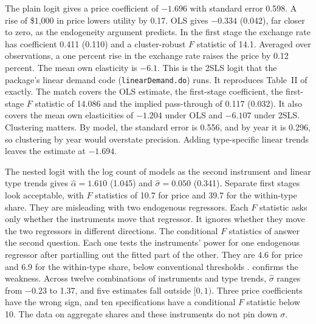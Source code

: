 The plain logit gives a price coefficient of $-1.696$ with standard error 0.598. A rise of \$1,000 in price lowers
utility by 0.17. OLS gives $-0.334$ (0.042), far closer to zero, as the endogeneity argument predicts. In the first stage
the exchange rate has coefficient 0.411 (0.110) and a cluster-robust $F$ statistic of 14.1. Averaged over observations, a
one percent rise in the exchange rate raises the price by 0.12 percent. The mean own elasticity is $-6.1$. This is the
2SLS logit that the package's linear demand code (\texttt{linearDemand.do}) runs. It reproduces Table~II of
\citet{GriecoMurryYurukoglu2024} exactly. The match covers the OLS estimate, the first-stage coefficient, the first-stage
$F$ statistic of 14.086 and the implied pass-through of 0.117 (0.032). It also covers the mean own elasticities of
$-1.204$ under OLS and $-6.107$ under 2SLS.
Clustering matters. By model, the standard error is 0.556, and by year it is 0.296, so clustering by year would
overstate precision. Adding type-specific linear trends leaves the estimate at $-1.694$.

The nested logit with the log count of models as the second instrument and linear type trends gives
$\hat\alpha = 1.610$ (1.045) and $\hat\sigma = 0.050$ (0.341). Separate first stages look acceptable, with $F$
statistics of 10.7 for price and 39.7 for the within-type share. They are misleading with two endogenous regressors.
Each $F$ statistic asks only whether the instruments move that regressor. It ignores whether they move the two
regressors in different directions. The conditional $F$ statistics of \citet{SandersonWindmeijer2016} answer the second question.
Each one tests the instruments' power for one endogenous regressor after partialling out the fitted part of the other.
They are 4.6 for price and 6.9 for the within-type share, below conventional thresholds \citep{StaigerStock1997}.
 confirms the weakness. Across twelve combinations of instruments and type trends, $\hat\sigma$
ranges from $-0.23$ to 1.37, and five estimates fall outside $[0, 1)$. Three price coefficients have the wrong sign, and
ten specifications have a conditional $F$ statistic below 10. The data on aggregate shares and these instruments do not pin
down $\sigma$.

